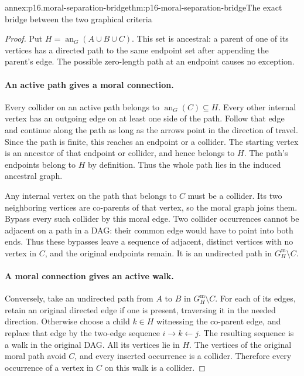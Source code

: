 \begin{annexitem}{annex:p16.moral-separation-bridge}{thm:p16-moral-separation-bridge}{The exact bridge between the two graphical criteria}
\begin{proof}
Put \(H=\operatorname{an}_G(A\cup B\cup C)\). This set is
ancestral: a parent of one of its vertices has a directed path to the
same endpoint set after appending the parent's edge. The possible
zero-length path at an endpoint causes no exception.

\paragraph{An active path gives a moral connection.}
Every collider on an active path belongs to
\(\operatorname{an}_G(C)\subseteq H\). Every other internal
vertex has an outgoing edge on at least one side of the path. Follow
that edge and continue along the path as long as the arrows point in
the direction of travel. Since the path is finite, this reaches an
endpoint or a collider. The starting vertex is an ancestor of that
endpoint or collider, and hence belongs to \(H\). The path's
endpoints belong to \(H\) by definition. Thus the whole path lies
in the induced ancestral graph.

Any internal vertex on the path that belongs to \(C\) must be a
collider. Its two neighboring vertices are co-parents of that vertex,
so the moral graph joins them. Bypass every such collider by this
moral edge. Two collider occurrences cannot be adjacent on a path in
a DAG: their common edge would have to point into both ends. Thus
these bypasses leave a sequence of adjacent, distinct vertices with
no vertex in \(C\), and the original endpoints remain. It is an
undirected path in \(G_H^{\mathrm m}\setminus C\).

\paragraph{A moral connection gives an active walk.}
Conversely, take an undirected path from \(A\) to \(B\) in
\(G_H^{\mathrm m}\setminus C\). For each of its edges, retain
an original directed edge if one is present, traversing it in the
needed direction. Otherwise choose a child \(k\in H\) witnessing
the co-parent edge, and replace that edge by the two-edge sequence
\(i\to k\leftarrow j\). The resulting sequence is a walk in
the original DAG. All its vertices lie in \(H\). The vertices of
the original moral path avoid \(C\), and every inserted occurrence
is a collider. Therefore every occurrence of a vertex in \(C\)
on this walk is a collider.


\end{proof}
\end{annexitem}
